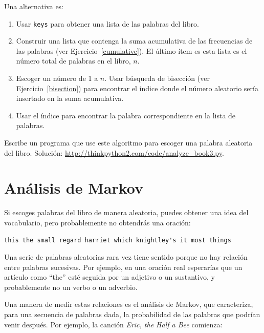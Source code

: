 \documentclass[10pt]{book}
\begin{document}
Una alternativa es:

\begin{enumerate}

\item Usar {\tt keys} para obtener una lista de las palabras del libro.

\item Construir una lista que contenga la suma acumulativa de las frecuencias
  de las palabras (ver Ejercicio~\ref{cumulative}).  El último ítem
  es esta lista es el número total de palabras en el libro, $n$.

\item Escoger un número de 1 a $n$.  Usar búsqueda de bisección
  (ver Ejercicio~\ref{bisection}) para encontrar el índice donde el número
  aleatorio sería insertado en la suma acumulativa.

\item Usar el índice para encontrar la palabra correspondiente en la lista de palabras.

\end{enumerate}

\begin{exercise}
\label{randhist}

Escribe un programa que use este algoritmo para escoger una palabra aleatoria del
libro.  Solución:
\url{http://thinkpython2.com/code/analyze_book3.py}.

\end{exercise}



\section{Análisis de Markov}
\label{markov}

Si escoges palabras del libro de manera aleatoria, puedes obtener una
idea del vocabulario, pero probablemente no obtendrás una oración:

\begin{verbatim}
this the small regard harriet which knightley's it most things
\end{verbatim}
%
Una serie de palabras aleatorias rara vez tiene sentido porque
no hay relación entre palabras sucesivas.  Por ejemplo, en
una oración real esperarías que un artículo como ``the'' esté
seguida por un adjetivo o un sustantivo, y probablemente no un verbo
o un adverbio.

Una manera de medir estas relaciones es el análisis de
Markov, que
caracteriza, para una secuencia de palabras dada, la probabilidad de las
palabras que podrían venir después.  Por ejemplo, la canción {\em Eric, the Half a
  Bee} comienza:
\end{document}
